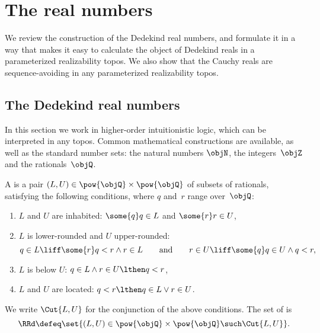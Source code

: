 \section{The real numbers}
\label{sec:real-numbers-object}

We review the construction of the Dedekind real numbers, and formulate it in a way that makes it easy to calculate the object of Dedekind reals in a parameterized realizability topos.
%
We also show that the Cauchy reals are sequence-avoiding in any parameterized realizability topos.

\subsection{The Dedekind real numbers}
\label{sec:dedek-real-numb}

In this section we work in higher-order intuitionistic logic, which can be interpreted in any topos.
%
Common mathematical constructions are available, as well as the standard number sets: the natural numbers $\objN$, the integers~$\objZ$ and the rationals~$\objQ$.

\begin{definition}
  \label{def:dedekind-reals}%
  A  is a pair $(L, U) \in \pow{\objQ} \times \pow{\objQ}$ of subsets of rationals, satisfying the following conditions, where $q$ and~$r$ range over~$\objQ$:
  \begin{enumerate}
  \item $L$ and $U$ are inhabited: $\some{q} q \in L$ and $\some{r} r \in U$,
  \item $L$ is lower-rounded and $U$ upper-rounded:
    \begin{equation*}
      q \in L \liff \some{r} q < r \land r \in L 
      \qquad\text{and}\qquad
      r \in U \liff \some{q} q \in U \land q < r,
    \end{equation*}
  \item $L$ is below $U$: $q \in L \land r \in U \lthen q < r$,
  \item $L$ and $U$ are located: $q < r \lthen q \in L \lor r \in U$.
  \end{enumerate}
  We write $\Cut{L,U}$ for the conjunction of the above conditions.
  The set of  is
  \begin{equation*}
    \RRd \defeq \set{ (L, U) \in \pow{\objQ} \times \pow{\objQ} \such \Cut{L, U} }.
  \end{equation*}
\end{definition}

